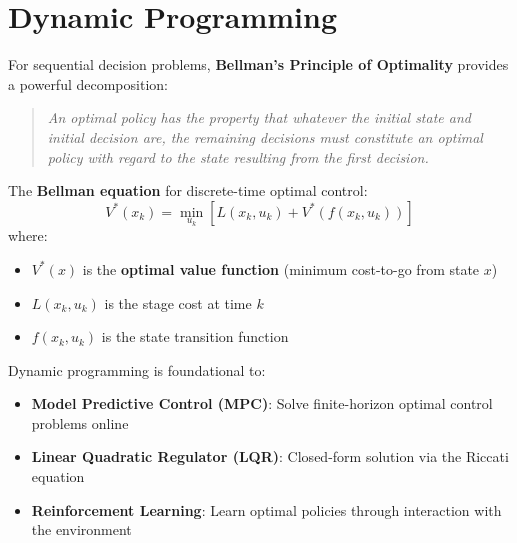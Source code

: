 \section{Dynamic Programming}

For sequential decision problems, \textbf{Bellman's Principle of Optimality} provides a powerful decomposition:

\begin{quote}
\textit{An optimal policy has the property that whatever the initial state and initial decision are, the remaining decisions must constitute an optimal policy with regard to the state resulting from the first decision.}
\end{quote}

The \textbf{Bellman equation} for discrete-time optimal control:
\begin{equation}
V^*(x_k) = \min_{u_k} \left[ L(x_k, u_k) + V^*(f(x_k, u_k)) \right]
\end{equation}
where:
\begin{itemize}
    \item $V^*(x)$ is the \textbf{optimal value function} (minimum cost-to-go from state $x$)
    \item $L(x_k, u_k)$ is the stage cost at time $k$
    \item $f(x_k, u_k)$ is the state transition function
\end{itemize}

\begin{keyconceptbox}[title=Dynamic Programming in Control]
Dynamic programming is foundational to:
\begin{itemize}
    \item \textbf{Model Predictive Control (MPC)}: Solve finite-horizon optimal control problems online
    \item \textbf{Linear Quadratic Regulator (LQR)}: Closed-form solution via the Riccati equation
    \item \textbf{Reinforcement Learning}: Learn optimal policies through interaction with the environment
\end{itemize}
\end{keyconceptbox}

